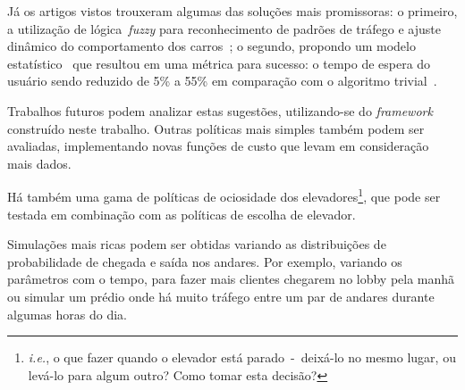 Já os artigos vistos trouxeram algumas das soluções mais promissoras: o
primeiro, a utilização de lógica~\textit{fuzzy} para reconhecimento de padrões
de tráfego e ajuste dinâmico do comportamento dos carros~\cite{marja97}; o
segundo, propondo um modelo estatístico~\cite{DBLP:journals/corr/abs-1212-2499}
que resultou em uma métrica para sucesso: o tempo de espera do usuário sendo
reduzido de 5\% a 55\% em comparação com o algoritmo
trivial~\cite{DBLP:journals/corr/abs-1212-2499}.

Trabalhos futuros podem analizar estas sugestões, utilizando-se do
\textit{framework} construído neste trabalho. Outras políticas mais simples
também podem ser avaliadas, implementando novas funções de custo que levam em
consideração mais dados.

Há também uma gama de políticas de ociosidade dos
elevadores\footnote{\textit{i.e.}, o que fazer quando o elevador está
  parado~-~deixá-lo no mesmo lugar, ou levá-lo para algum outro? Como tomar esta
decisão?}, que pode ser testada em combinação com as políticas de escolha de elevador.

Simulações mais ricas podem ser obtidas variando as distribuições de
probabilidade de chegada e saída nos andares. Por exemplo, variando os
parâmetros com o tempo, para fazer mais clientes chegarem no lobby pela manhã ou
simular um prédio onde há muito tráfego entre um par de andares durante algumas
horas do dia.
